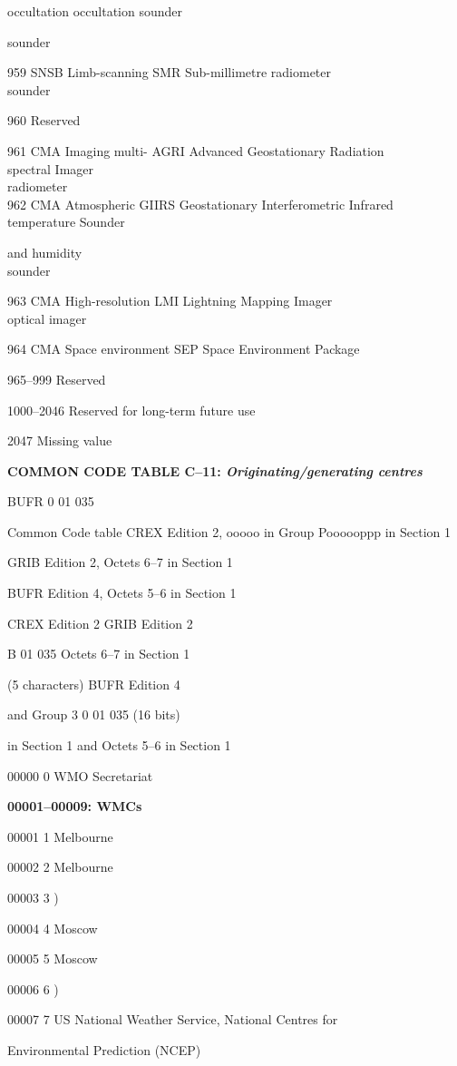 occultation occultation sounder

sounder

959 SNSB Limb-scanning SMR Sub-millimetre radiometer\\
sounder

960 Reserved

961 CMA Imaging multi- AGRI Advanced Geostationary Radiation\\
spectral Imager\\
radiometer\\
962 CMA Atmospheric GIIRS Geostationary Interferometric Infrared temperature Sounder

and humidity\\
sounder

963 CMA High-resolution LMI Lightning Mapping Imager\\
optical imager

964 CMA Space environment SEP Space Environment Package

965--999 Reserved

1000--2046 Reserved for long-term future use

2047 Missing value

\textbf{COMMON CODE TABLE C--11: \emph{Originating/generating centres}}

BUFR 0 01 035

Common Code table CREX Edition 2, ooooo in Group Poooooppp in Section 1

GRIB Edition 2, Octets 6--7 in Section 1

BUFR Edition 4, Octets 5--6 in Section 1

CREX Edition 2 GRIB Edition 2

B 01 035 Octets 6--7 in Section 1

(5 characters) BUFR Edition 4

and Group 3 0 01 035 (16 bits)

in Section 1 and Octets 5--6 in Section 1

00000 0 WMO Secretariat

\textbf{00001--00009: WMCs}

00001 1 Melbourne

00002 2 Melbourne

00003 3 )

00004 4 Moscow

00005 5 Moscow

00006 6 )

00007 7 US National Weather Service, National Centres for

Environmental Prediction (NCEP)

